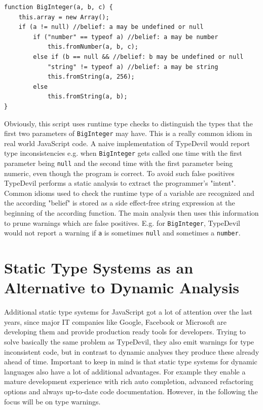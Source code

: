 \documentclass[runningheads,a4paper]{llncs}
\begin{document}
\medskip\medskip
\lstset{language=javascript}
\begin{minipage}{\linewidth}
\begin{lstlisting}[frame=single, caption=Pruning via Belief Analysis, label={lst:BeliefAnalysis}]
function BigInteger(a, b, c) { 
    this.array = new Array();
    if (a != null) //belief: a may be undefined or null
        if ("number" == typeof a) //belief: a may be number
            this.fromNumber(a, b, c);
        else if (b == null && //belief: b may be undefined or null
            "string" != typeof a) //belief: a may be string
            this.fromString(a, 256); 
        else  
            this.fromString(a, b);
}
\end{lstlisting}
\end{minipage}
Obviously, this script uses runtime type checks to distinguish the types that the first two parameters of \lstinline[columns=fixed]{BigInteger} may have.
This is a really common idiom in real world JavaScript code.
A naive implementation of TypeDevil would report type inconsistencies e.g. when \lstinline[columns=fixed]{BigInteger} gets called one time with the first parameter being \lstinline[columns=fixed]{null} and the second time with the first parameter being numeric, even though the program is correct. 
To avoid such false positives TypeDevil performs a static analysis to extract the programmer’s "intent".
Common idioms used to check the runtime type of a variable are recognized and the according "belief" is stored as a side effect-free string expression at the beginning of the according function.
The main analysis then uses this information to prune warnings which are false positives.
E.g. for \lstinline[columns=fixed]{BigInteger}, TypeDevil would not report a warning if \lstinline[columns=fixed]{a} is sometimes \lstinline[columns=fixed]{null} and sometimes a \lstinline[columns=fixed]{number}.

\section{Static Type Systems as an Alternative to Dynamic Analysis}

Additional static type systems for JavaScript got a lot of attention over the last years, since major IT companies like Google, Facebook or Microsoft are developing them and provide production ready tools for developers.
Trying to solve basically the same problem as TypeDevil, they also emit warnings for type inconsistent code, but in contrast to dynamic analyses they produce these already ahead of time.
Important to keep in mind is that static type systems for dynamic languages also have a lot of additional advantages.
For example they enable a mature development experience with rich auto completion, advanced refactoring options and always up-to-date code documentation.
However, in the following the focus will be on type warnings.
\end{document}
